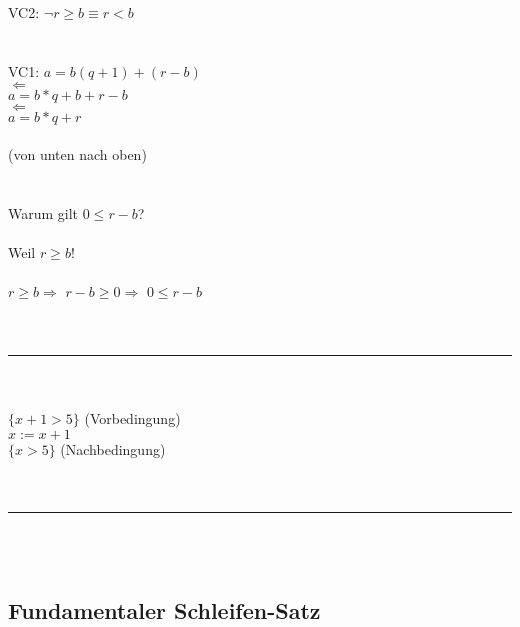 \documentclass[18pt,a4paper]{article}
\begin{document}
VC2: $\neg r \geqslant b \equiv  r< b$\\
\\
\\
VC1: $a= b(q+1) + (r-b) $\\
$\Leftarrow$\\
$a = b*q + b + r -b$\\
$\Leftarrow$\\
$a = b*q +r$\\
\\
(von unten nach oben)\\
\\
\\
Warum gilt $0\leqslant r-b $?\\
\\
Weil $r\geqslant b$!\\
\\
$r\geqslant b \Rightarrow$ $ r-b \geqslant 0 \Rightarrow$ $ 0\leqslant r-b$\\
\\
\\
\rule{\textwidth}{0.4mm}\\
\\
$\{ x+1 > 5 \}$ (Vorbedingung)\\
$x := x+1 $\\
$\{ x > 5 \}$ (Nachbedingung)\\
\\
\\
\rule{\textwidth}{0.4mm}\\
\\

\subsection{Fundamentaler Schleifen-Satz}
\end{document}

